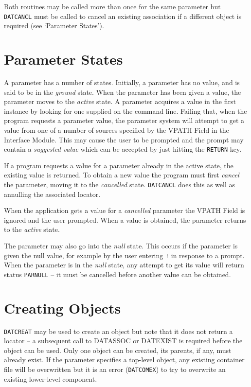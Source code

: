 \documentclass[twoside,11pt]{article}
\newcommand{\htmlref}[2]{#1}
\newcommand{\xref}[3]{#1}
\newcommand{\xlabel}[1]{}
\renewcommand{\_}{\texttt{\symbol{95}}}
\begin{document}
Both routines may be called more than once for the same parameter but 
\texttt{DAT\_CANCL} must be called to cancel an existing association if a 
different object is required (see 
\htmlref{`Parameter States'}{parameter_states}).

\section{\xlabel{parameter_states}Parameter States\label{parameter_states}}
A parameter has a number of states.  Initially, a parameter has no
value, and is said to be in the \textit{ground\/} state.  When the
parameter has been given a value, the parameter moves to the \textit{active\/} 
state.  A parameter acquires a value in the first instance by
looking for one supplied on the command line.  Failing that, when the program
requests a parameter value, the parameter system will attempt to get a value 
from one of a number of sources specified by
\xref{the VPATH Field}{sun115}{the_vpath_field}
in the Interface Module.
This may cause the user to be prompted and the prompt may contain a 
\textit{suggested value} which can be accepted by just hitting the
\texttt{RETURN} key.

If a program requests a value for a parameter already in the active state, 
the existing value is returned.  
To obtain a new value the program must first \textit{cancel\/} the 
parameter, moving it to the \textit{cancelled\/} state.  
\htmlref{\texttt{DAT\_CANCL}}{DAT_CANCL} does this as well as annulling the
associated locator.

When the application gets a value for a \textit{ cancelled\/} parameter
\xref{the VPATH Field}{sun115}{the_vpath_field}
is ignored and the user prompted. When a value is obtained, the parameter
returns to the \textit{ active\/} state.

The parameter may also go into the \textit{null\/} state. This occurs if the
parameter is given the null value, for example by the user entering \texttt{!}
in response to a prompt. When the parameter is in the \textit{null\/} state,
any attempt to get its value will return status \texttt{PAR\_\_NULL} -- it
must be cancelled before another value can be obtained.


\section{\xlabel{creating_objects}Creating Objects}
\htmlref{\texttt{DAT\_CREAT}}{DAT_CREAT} may be used to create an object but
note that it does not return a locator -- a subsequent call to DAT\_ASSOC
or DAT\_EXIST is required before the object can be used. 
Only one object can be created, its parents, if any, must already exist. 
If the parameter specifies a top-level object, any existing container file will
be overwritten but it is an error (\texttt{DAT\_\_COMEX}) to try to overwrite 
an existing lower-level component.
\end{document}
